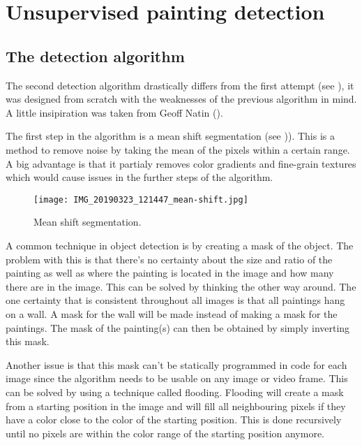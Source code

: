 \section{Unsupervised painting detection}
\label{sec:unsupervised_painting_detection}

\subsection{The detection algorithm}
\label{subsec:detection-algo}

The second detection algorithm drastically differs from the first attempt (see ), it was designed from scratch with the weaknesses of the previous algorithm in mind. A little insipiration was taken from Geoff Natin (\cite{natin2020}).

The first step in the algorithm is a mean shift segmentation (see )). This is a method to remove noise by taking the mean of the pixels within a certain range. A big advantage is that it partialy removes color gradients and fine-grain textures which would cause issues in the further steps of the algorithm.

\begin{figure}[h]
    \texttt{[image: IMG\_20190323\_121447\_mean-shift.jpg]}
    \centering
    \caption{Mean shift segmentation.}
    \label{fig:paiting_detection_mean_shift}
\end{figure}

A common technique in object detection is by creating a mask of the object. The problem with this is that there's no certainty about the size and ratio of the painting as well as where the painting is located in the image and how many there are in the image. This can be solved by thinking the other way around. The one certainty that is consistent throughout all images is that all paintings hang on a wall. A mask for the wall will be made instead of making a mask for the paintings. The mask of the painting(s) can then be obtained by simply inverting this mask.

Another issue is that this mask can't be statically programmed in code for each image since the algorithm needs to be usable on any image or video frame. This can be solved by using a technique called flooding. Flooding will create a mask from a starting position in the image and will fill all neighbouring pixels if they have a color close to the color of the starting position. This is done recursively until no pixels are within the color range of the starting position anymore. \cite{he2019scan}

